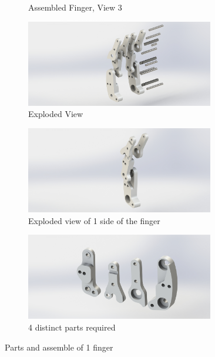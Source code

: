\begin{figure}
\begin{subfigure}{.45\linewidth}
        \caption{Assembled Finger, View 3}
        \label{fig:AssFinger3}
    \end{subfigure}
    \begin{subfigure}{.45\linewidth}
        \centering
        \includegraphics[width=0.9\textwidth]{Images/GripperDesign/11.JPG}          
        \caption{Exploded View}
        \label{fig:Exploded}
    \end{subfigure}
    \begin{subfigure}{.45\linewidth}
        \centering
        \includegraphics[width=0.9\textwidth]{Images/GripperDesign/12.JPG}
        \caption{Exploded view of 1 side of the finger}
        \label{fig:Explodedhalf}
    \end{subfigure}
    \begin{subfigure}{.45\linewidth}
        \centering
        \includegraphics[width=0.9\textwidth]{Images/GripperDesign/14.JPG}          
        \caption{4 distinct parts required}
        \label{label:}
    \end{subfigure}
    \label{fig:4Parts2}
    \caption{Parts and assemble of 1 finger}
    \label{figure:ViewsOf1Finger}
\end{figure}

